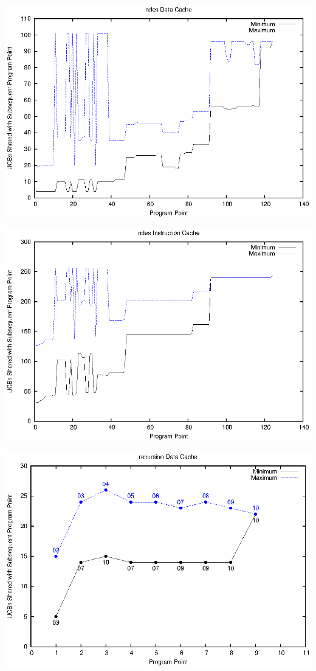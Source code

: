 \begin{center}
  \includegraphics[width=\linewidth]{eps/ndes-dcache.eps}
\end{center}
\begin{center}
  \includegraphics[width=\linewidth]{eps/ndes-icache.eps}
\end{center}
\begin{center}
  \includegraphics[width=\linewidth]{eps/recursion-dcache.eps}
\end{center}
